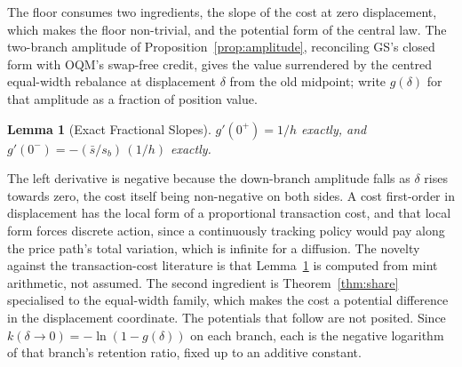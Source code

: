 \documentclass[11pt,a4paper]{article}
\theoremstyle{definition}
\theoremstyle{plain}
\newtheorem{lemma}{Lemma}
\theoremstyle{remark}
\begin{document}
The floor consumes two ingredients, the slope of the cost at zero displacement, which makes the floor non-trivial, and the potential form of the central law. The two-branch amplitude of Proposition~\ref{prop:amplitude}, reconciling GS's closed form with OQM's swap-free credit, gives the value surrendered by the centred equal-width rebalance at displacement $\delta$ from the old midpoint; write $g(\delta)$ for that amplitude as a fraction of position value.

\begin{lemma}[Exact Fractional Slopes]\label{lem:slopes}
$g'(0^+) = 1/h$ exactly, and $g'(0^-) = -(\bar s / s_b)\,(1/h)$ exactly.
\end{lemma}

The left derivative is negative because the down-branch amplitude falls as $\delta$ rises towards zero, the cost itself being non-negative on both sides. A cost first-order in displacement has the local form of a proportional transaction cost, and that local form forces discrete action, since a continuously tracking policy would pay along the price path's total variation, which is infinite for a diffusion. The novelty against the transaction-cost literature is that Lemma~\ref{lem:slopes} is computed from mint arithmetic, not assumed. The second ingredient is Theorem~\ref{thm:share} specialised to the equal-width family, which makes the cost a potential difference in the displacement coordinate. The potentials that follow are not posited. Since $k(\delta \to 0) = -\ln(1 - g(\delta))$ on each branch, each is the negative logarithm of that branch's retention ratio, fixed up to an additive constant.
\end{document}
